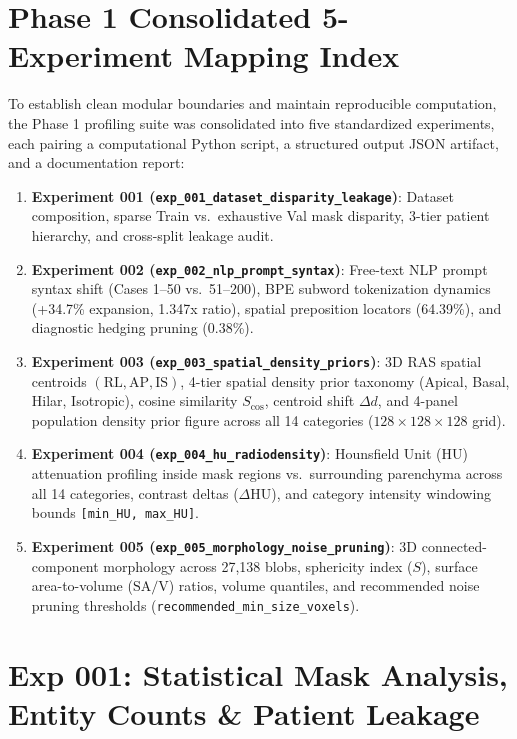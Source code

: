 \documentclass[11pt,a4paper]{article}
\begin{document}
\section{Phase 1 Consolidated 5-Experiment Mapping Index}

To establish clean modular boundaries and maintain reproducible computation, the Phase 1 profiling suite was consolidated into five standardized experiments, each pairing a computational Python script, a structured output JSON artifact, and a documentation report:

\begin{enumerate}
    \item \textbf{Experiment 001 (\texttt{exp\_001\_dataset\_disparity\_leakage})}: Dataset composition, sparse Train vs.\ exhaustive Val mask disparity, 3-tier patient hierarchy, and cross-split leakage audit.
    \item \textbf{Experiment 002 (\texttt{exp\_002\_nlp\_prompt\_syntax})}: Free-text NLP prompt syntax shift (Cases 1--50 vs.\ 51--200), BPE subword tokenization dynamics (+34.7\% expansion, 1.347x ratio), spatial preposition locators (64.39\%), and diagnostic hedging pruning (0.38\%).
    \item \textbf{Experiment 003 (\texttt{exp\_003\_spatial\_density\_priors})}: 3D RAS spatial centroids $(\text{RL}, \text{AP}, \text{IS})$, 4-tier spatial density prior taxonomy (Apical, Basal, Hilar, Isotropic), cosine similarity $S_{\text{cos}}$, centroid shift $\Delta d$, and 4-panel population density prior figure across all 14 categories ($128 \times 128 \times 128$ grid).
    \item \textbf{Experiment 004 (\texttt{exp\_004\_hu\_radiodensity})}: Hounsfield Unit (HU) attenuation profiling inside mask regions vs.\ surrounding parenchyma across all 14 categories, contrast deltas ($\Delta \text{HU}$), and category intensity windowing bounds \texttt{[min\_HU, max\_HU]}.
    \item \textbf{Experiment 005 (\texttt{exp\_005\_morphology\_noise\_pruning})}: 3D connected-component morphology across 27,138 blobs, sphericity index ($S$), surface area-to-volume ($\text{SA}/\text{V}$) ratios, volume quantiles, and recommended noise pruning thresholds (\texttt{recommended\_min\_size\_voxels}).
\end{enumerate}

\section{Exp 001: Statistical Mask Analysis, Entity Counts \& Patient Leakage}
\end{document}
